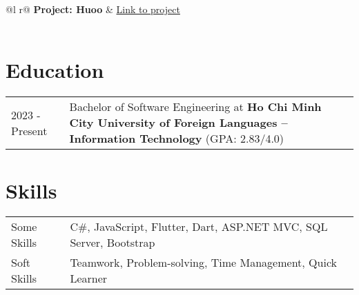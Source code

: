 \documentclass[a4paper,12pt]{article}
\begin{document}
\begin{tabularx}{\linewidth}{ @{}l r@{} }
\textbf{Project: Huoo} & \hfill \href{https://github.com/FoxeiZ/huoo}{Link to project} \\[3.75pt]
  \\
\end{tabularx}

\section{Education}
\begin{tabularx}{\linewidth}{@{}l X@{}}	
2023 - Present & Bachelor of Software Engineering at \textbf{Ho Chi Minh City University of Foreign Languages – Information Technology} \normalsize (GPA: 2.83/4.0) \\
\end{tabularx}

\section{Skills}
\begin{tabularx}{\linewidth}{@{}l X@{}}
Some Skills &  \normalsize{C\#, JavaScript, Flutter, Dart, ASP.NET MVC, SQL Server, Bootstrap} \\
Soft Skills  &  \normalsize{Teamwork, Problem-solving, Time Management, Quick Learner} \\  
\end{tabularx}

\vfill
{}
\end{document}
